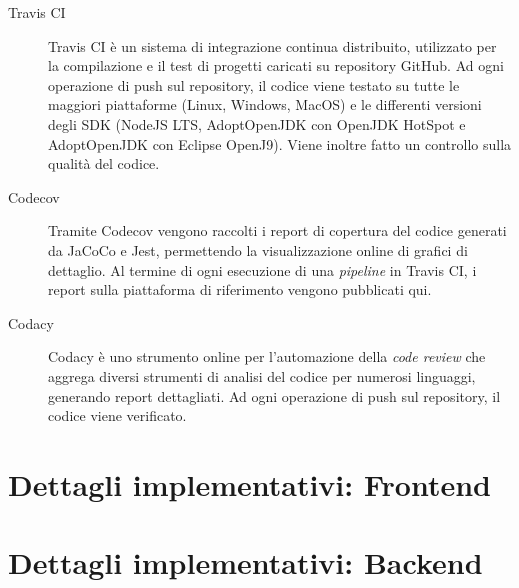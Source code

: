       \begin{description}
        \item[Travis CI]
          Travis CI è un sistema di integrazione continua distribuito, utilizzato per la compilazione e il test di progetti caricati su repository GitHub.
          Ad ogni operazione di push sul repository, il codice viene testato su tutte le maggiori piattaforme (Linux, Windows, MacOS) e le differenti versioni degli SDK (NodeJS LTS, AdoptOpenJDK con OpenJDK HotSpot e AdoptOpenJDK con Eclipse OpenJ9).
          Viene inoltre fatto un controllo sulla qualità del codice.

        \item[Codecov]
          Tramite Codecov vengono raccolti i report di copertura del codice generati da JaCoCo e Jest, permettendo la visualizzazione online di grafici di dettaglio.
          Al termine di ogni esecuzione di una \emph{pipeline} in Travis CI, i report sulla piattaforma di riferimento vengono pubblicati qui.

        \item[Codacy]
          Codacy è uno strumento online per l'automazione della \emph{code review} che aggrega diversi strumenti di analisi del codice per numerosi linguaggi, generando report dettagliati.
          Ad ogni operazione di push sul repository, il codice viene verificato.
      \end{description}






  \section{Dettagli implementativi: Frontend}
  \section{Dettagli implementativi: Backend}
